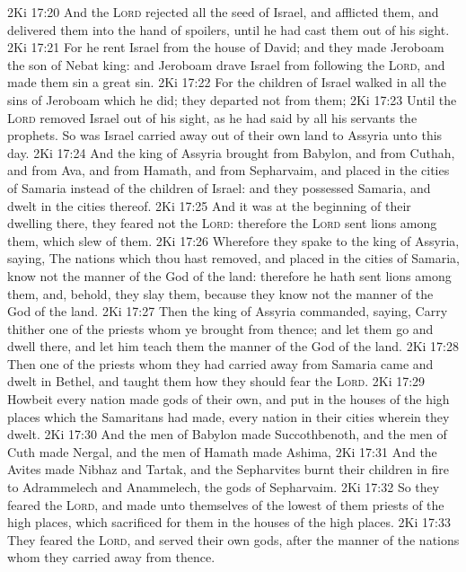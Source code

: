 \vs 2Ki 17:20 And the \textsc{Lord} rejected all the seed of Israel, and afflicted them, and delivered them into the hand of spoilers, until he had cast them out of his sight.
\vs 2Ki 17:21 For he rent Israel from the house of David; and they made Jeroboam the son of Nebat king: and Jeroboam drave Israel from following the \textsc{Lord}, and made them sin a great sin.
\vs 2Ki 17:22 For the children of Israel walked in all the sins of Jeroboam which he did; they departed not from them;
\vs 2Ki 17:23 Until the \textsc{Lord} removed Israel out of his sight, as he had said by all his servants the prophets. So was Israel carried away out of their own land to Assyria unto this day.
\vs 2Ki 17:24 And the king of Assyria brought  from Babylon, and from Cuthah, and from Ava, and from Hamath, and from Sepharvaim, and placed  in the cities of Samaria instead of the children of Israel: and they possessed Samaria, and dwelt in the cities thereof.
\vs 2Ki 17:25 And  it was at the beginning of their dwelling there,  they feared not the \textsc{Lord}: therefore the \textsc{Lord} sent lions among them, which slew  of them.
\vs 2Ki 17:26 Wherefore they spake to the king of Assyria, saying, The nations which thou hast removed, and placed in the cities of Samaria, know not the manner of the God of the land: therefore he hath sent lions among them, and, behold, they slay them, because they know not the manner of the God of the land.
\vs 2Ki 17:27 Then the king of Assyria commanded, saying, Carry thither one of the priests whom ye brought from thence; and let them go and dwell there, and let him teach them the manner of the God of the land.
\vs 2Ki 17:28 Then one of the priests whom they had carried away from Samaria came and dwelt in Bethel, and taught them how they should fear the \textsc{Lord}.
\vs 2Ki 17:29 Howbeit every nation made gods of their own, and put  in the houses of the high places which the Samaritans had made, every nation in their cities wherein they dwelt.
\vs 2Ki 17:30 And the men of Babylon made Succothbenoth, and the men of Cuth made Nergal, and the men of Hamath made Ashima,
\vs 2Ki 17:31 And the Avites made Nibhaz and Tartak, and the Sepharvites burnt their children in fire to Adrammelech and Anammelech, the gods of Sepharvaim.
\vs 2Ki 17:32 So they feared the \textsc{Lord}, and made unto themselves of the lowest of them priests of the high places, which sacrificed for them in the houses of the high places.
\vs 2Ki 17:33 They feared the \textsc{Lord}, and served their own gods, after the manner of the nations whom they carried away from thence.
